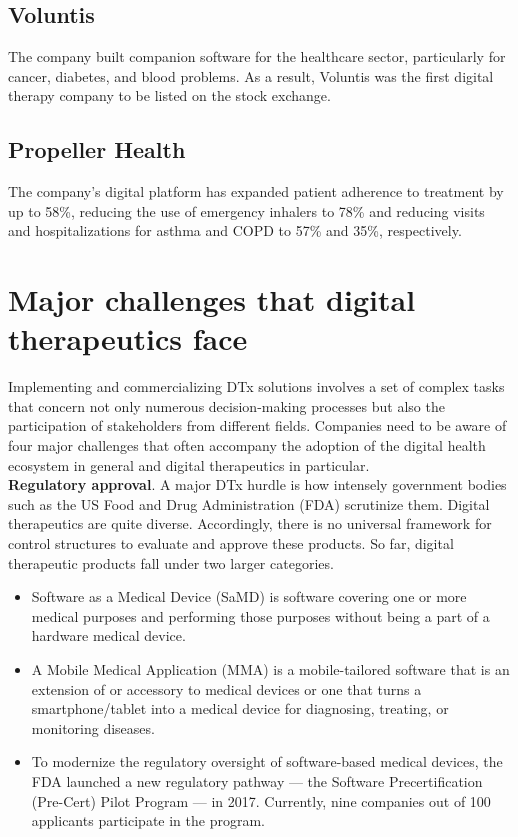 \documentclass[15pt]{article}
\begin{document}
\subsection{Voluntis}
The company built companion software for the healthcare sector, particularly for cancer, diabetes, and blood problems. As a result, Voluntis was the first digital therapy company to be listed on the stock exchange.
\subsection{Propeller Health}
The company’s digital platform has expanded patient adherence to treatment by up to 58\%, reducing the use of emergency inhalers to 78\% and reducing visits and hospitalizations for asthma and COPD to 57\% and 35\%, respectively.
 

\section{Major challenges that digital therapeutics face}
Implementing and commercializing DTx solutions involves a set of complex tasks that concern not only numerous decision-making processes but also the participation of stakeholders from different fields. Companies need to be aware of four major challenges that often accompany the adoption of the digital health ecosystem in general and digital therapeutics in particular.\\

\textbf{Regulatory approval}. A major DTx hurdle is how intensely government bodies such as the US Food and Drug Administration (FDA) scrutinize them. Digital therapeutics are quite diverse. Accordingly, there is no universal framework for control structures to evaluate and approve these products. So far, digital therapeutic products fall under two larger categories.\\

\begin{itemize}
\item Software as a Medical Device (SaMD) is software covering one or more medical purposes and performing those purposes without being a part of a hardware medical device.
\item A Mobile Medical Application (MMA) is a mobile-tailored software that is an extension of or accessory to medical devices or one that turns a smartphone/tablet into a medical device for diagnosing, treating, or monitoring diseases.
\item To modernize the regulatory oversight of software-based medical devices, the FDA launched a new regulatory pathway — the Software Precertification (Pre-Cert) Pilot Program — in 2017. Currently, nine companies out of 100 applicants participate in the program.
\end{itemize}
\end{document}
